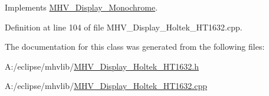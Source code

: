 \-Implements \hyperlink{class_m_h_v___display___monochrome_a58a17e8662802e7f5d6ccd6f0bcc51a0}{\-M\-H\-V\-\_\-\-Display\-\_\-\-Monochrome}.



\-Definition at line 104 of file \-M\-H\-V\-\_\-\-Display\-\_\-\-Holtek\-\_\-\-H\-T1632.\-cpp.



\-The documentation for this class was generated from the following files\-:\begin{DoxyCompactItemize}
\item 
\-A\-:/eclipse/mhvlib/\hyperlink{_m_h_v___display___holtek___h_t1632_8h}{\-M\-H\-V\-\_\-\-Display\-\_\-\-Holtek\-\_\-\-H\-T1632.\-h}\item 
\-A\-:/eclipse/mhvlib/\hyperlink{_m_h_v___display___holtek___h_t1632_8cpp}{\-M\-H\-V\-\_\-\-Display\-\_\-\-Holtek\-\_\-\-H\-T1632.\-cpp}\end{DoxyCompactItemize}
